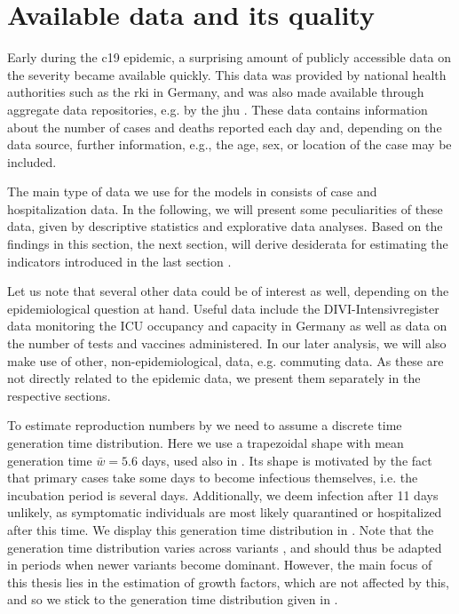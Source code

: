 \section{Available data and its quality}
\label{sec:data}

Early during the \acrshort{c19} epidemic, a surprising amount of publicly accessible data on the severity became available quickly. This data was provided by national health authorities such as the \acrfull{rki} in Germany, and was also made available through aggregate data repositories, e.g. by the \acrfull{jhu} \citep{Dong2020Interactive}. These data contains information about the number of cases and deaths reported each day and, depending on the data source, further information, e.g., the age, sex, or location of the case may be included.

The main type of data we use for the models in  consists of case and hospitalization data. In the following, we will present some peculiarities of these data, given by descriptive statistics and explorative data analyses. Based on the findings in this section, the next section,  will derive desiderata for estimating the indicators introduced in the last section .

Let us note that several other data could be of interest as well, depending on the epidemiological question at hand. Useful data include the DIVI-Intensivregister data monitoring the ICU occupancy and capacity in Germany as well as data on the number of tests and vaccines administered. In our later analysis, we will also make use of other, non-epidemiological, data, e.g. commuting data. As these are not directly related to the epidemic data, we present them separately in the respective sections.

To estimate reproduction numbers by  we need to assume a discrete time generation time distribution. Here we use a trapezoidal shape with mean generation time $\bar w = 5.6$ days, used also in \citep{Burgard2021Regional}. Its shape is motivated by the fact that primary cases take some days to become infectious themselves, i.e. the incubation period is several days. Additionally, we deem infection after 11 days unlikely, as symptomatic individuals are most likely quarantined or hospitalized after this time. We display this generation time distribution in . Note that the generation time distribution varies across variants \citep{Hart2022Generationa}, and should thus be adapted in periods when newer variants become dominant. However, the main focus of this thesis lies in the estimation of growth factors, which are not affected by this, and so we stick to the generation time distribution given in .

